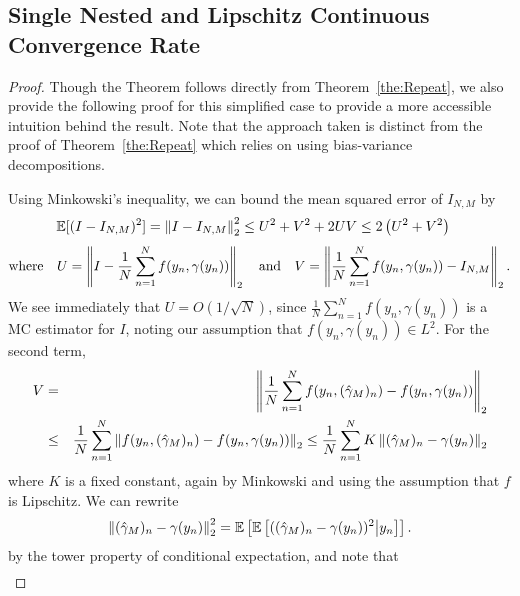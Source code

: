 
\subsection{Single Nested and Lipschitz Continuous Convergence Rate}
\label{sec:app:rate_single}

\theRate*

\begin{proof}
	Though the Theorem follows directly from Theorem~\ref{the:Repeat}, we also provide the following proof 
	for this simplified case to provide a more accessible intuition behind the result.  Note that the approach
	taken is distinct from the proof of Theorem~\ref{the:Repeat} which relies on using bias-variance decompositions.
	
	Using Minkowski's inequality, we can bound the mean squared error of $I_{N,M}$ by
	\begin{align} \label{eq:mse-bound-app}\begin{split}
	\mathbb{E}[(I-I_{N,M})^2] &= \left\lVert I - I_{N,M}\right\rVert_2^2 \leq {U}^2 + {V}^2 + 2 U V \leq 2\left(U^2 + V^2\right)
	\end{split}
	\end{align}
	\begin{eqnarray*}
		\text{where} \quad U = \left\lVert I - \frac{1}{N} \sum_{n=1}^N f(y_n, \gamma(y_n))\right\rVert_2
		\quad \text{and} \quad
		V = \left\lVert\frac{1}{N} \sum_{n=1}^N f(y_n, \gamma(y_n)) - I_{N,M}\right\rVert_2.
	\end{eqnarray*}
	We see immediately that $U = O\left(1 / \sqrt{N}\right)$, since $\frac{1}{N} \sum_{n=1}^N
	f(y_n, \gamma(y_n))$ is a MC estimator for $I$, noting our assumption that
	$f(y_n, \gamma(y_n)) \in L^2$. For the second term,
	\begin{eqnarray*}
		V &=& \left\lVert\frac{1}{N} \sum_{n=1}^N f(y_n, (\hat{\gamma}_M)_n) - f(y_n, \gamma(y_n))\right\rVert_2 \\
		&\leq& \frac{1}{N} \sum_{n=1}^{N} \left\lVert f(y_n, (\hat{\gamma}_M)_n) - f(y_n,
			\gamma(y_n))\right\rVert_2
		\leq \frac{1}{N} \sum_{n=1}^N K \left\lVert(\hat{\gamma}_M)_n - \gamma(y_n)\right\rVert_2 \\
	\end{eqnarray*}
	where $K$ is a fixed constant, again by Minkowski and using the assumption that $f$ is
	Lipschitz. We can rewrite
	\[
	\left\lVert(\hat{\gamma}_M)_n - \gamma(y_n)\right\rVert_2^2
	= \mathbb{E} \left[ \mathbb{E} \left[ ((\hat{\gamma}_M)_n - \gamma(y_n))^2 \middle| y_n \right]\right].
	\]
	by the tower property of conditional expectation, and note that
	\begin{align*}

\end{align*}
\end{proof}
